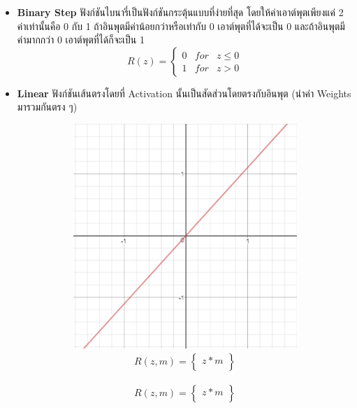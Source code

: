 \begin{itemize}
    \item \textbf{Binary Step} ฟังก์ชันไบนารี่เป็นฟังก์ชันกระตุ้นแบบที่ง่ายที่สุด โดยให้ค่าเอาต์พุตเพียงแค่ 2 ค่าเท่านั้นคือ 0 กับ 1
    ถ้าอินพุตมีค่าน้อยกว่าหรือเท่ากับ 0 เอาต์พุตที่ได้จะเป็น 0 และถ้าอินพุตมีค่ามากกว่า 0 เอาต์พุตที่ได้ก็จะเป็น 1
    \begin{equation}
        R(z) = \left\{
            \begin{array}{lll}
                0 & for & z \leq 0  \\
                1 & for & z > 0
            \end{array}
        \right.
    \end{equation}

    \item \textbf{Linear} ฟังก์ชันเส้นตรงโดยที่ Activation นั้นเป็นสัดส่วนโดยตรงกับอินพุต (นำค่า Weights มารวมกันตรง ๆ)
    \begin{figure}[H]
        \centering
        \begin{subfigure}{0.5\textwidth}
            \centering
            \includegraphics[width=0.9\linewidth]{fig/actfunc_linear.png}
            \caption{%
                \begin{equation}
                    \begin{split}R(z,m) = \begin{Bmatrix} z*m \\

\end{Bmatrix}
\end{split}
\end{equation}}
\end{subfigure}
\end{figure}
\end{itemize}
